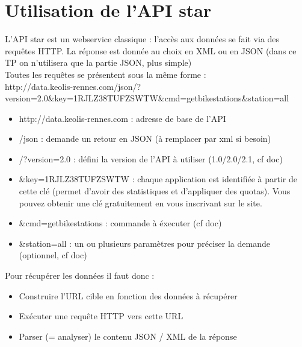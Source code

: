 \documentclass{article}
\begin{document}
\section{Utilisation de l'API star}
L'API star est un webservice classique : l'accès aux données se fait via des requêtes HTTP. La réponse est donnée au choix en XML ou en JSON (dans ce TP on n'utilisera que la partie JSON, plus simple)\\
Toutes les requêtes se présentent sous la même forme :\\ http://data.keolis-rennes.com/json/?version=2.0\&key=1RJLZ38TUFZSWTW\&cmd=getbikestations\&station=all
\begin{itemize} 
  \item http://data.keolis-rennes.com : adresse de base de l'API
  \item /json : demande un retour en JSON (à remplacer par xml si besoin)
  \item /?version=2.0 : défini la version de l'API à utiliser (1.0/2.0/2.1, cf doc)
  \item \&key=1RJLZ38TUFZSWTW : chaque application est identifiée à partir de cette clé (permet d'avoir des statistiques et d'appliquer des quotas). Vous pouvez obtenir une clé gratuitement en vous inscrivant sur le site.
  \item \&cmd=getbikestations : commande à éxecuter (cf doc)
  \item \&station=all : un ou plusieurs paramètres pour préciser la demande (optionnel, cf doc)
\end{itemize}
\newpage
Pour récupérer les données il faut donc :
\begin{itemize} 
  \item Construire l'URL cible en fonction des données à récupérer
  \item Exécuter une requête HTTP vers cette URL
  \item Parser (= analyser) le contenu JSON / XML de la réponse
\end{itemize}
\end{document}
